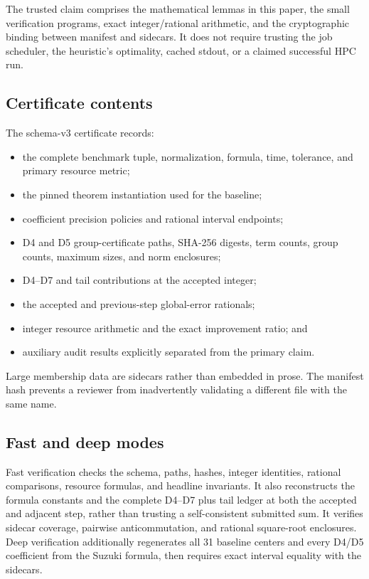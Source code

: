The trusted claim comprises the mathematical lemmas in this paper, the small
verification programs, exact integer/rational arithmetic, and the cryptographic
binding between manifest and sidecars.  It does not require trusting the job
scheduler, the heuristic's optimality, cached stdout, or a claimed successful
HPC run.

\subsection{Certificate contents}

The schema-v3 certificate records:
\begin{itemize}
  \item the complete benchmark tuple, normalization, formula, time, tolerance,
        and primary resource metric;
  \item the pinned theorem instantiation used for the baseline;
  \item coefficient precision policies and rational interval endpoints;
  \item D4 and D5 group-certificate paths, SHA-256 digests, term counts, group
        counts, maximum sizes, and norm enclosures;
  \item D4--D7 and tail contributions at the accepted integer;
  \item the accepted and previous-step global-error rationals;
  \item integer resource arithmetic and the exact improvement ratio; and
  \item auxiliary audit results explicitly separated from the primary claim.
\end{itemize}
Large membership data are sidecars rather than embedded in prose.  The
manifest hash prevents a reviewer from inadvertently validating a different
file with the same name.

\subsection{Fast and deep modes}

Fast verification checks the schema, paths, hashes, integer identities,
rational comparisons, resource formulas, and headline invariants.  It also
reconstructs the formula constants and the complete D4--D7 plus tail ledger at
both the accepted and adjacent step, rather than trusting a self-consistent
submitted sum.  It verifies sidecar coverage, pairwise anticommutation, and
rational square-root enclosures.  Deep verification additionally regenerates
all 31 baseline centers and every D4/D5 coefficient from the Suzuki formula,
then requires exact interval equality with the sidecars.

